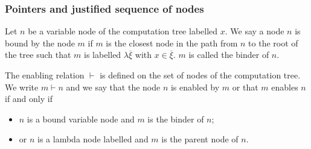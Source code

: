 \subsubsection{Pointers and justified sequence of nodes}

\begin{dfn}[Binder]
Let $n$ be a variable node of the computation tree labelled $x$. We
say a node $n$ is bound by the node $m$ if $m$ is the closest node
in the path from $n$ to the root of the tree such that $m$ is
labelled $\lambda \overline{\xi}$ with $x\in \overline{\xi}$. $m$ is
called the binder of $n$.
\end{dfn}

\begin{dfn}[Enabling]
The enabling relation $\vdash$ is defined on the set of nodes of the
computation tree. We write $m \vdash n$ and we say that the node $n$
is enabled by $m$ or that $m$ enables $n$ if and only if
\begin{itemize}
\item $n$ is a bound variable node and $m$ is the binder of $n$;
\item or $n$ is a lambda node labelled and $m$ is the parent node of $n$.
\end{itemize}
\end{dfn}



